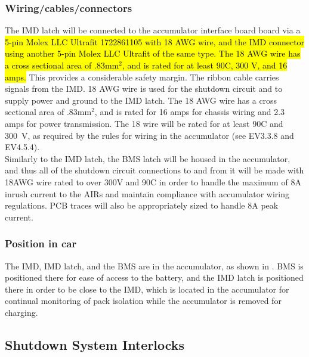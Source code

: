 \documentclass{article}
\DeclareRobustCommand{\hlr}[1]{{\sethlcolor{pink}\hl{#1}}}
\begin{document}
\subsubsection{Wiring/cables/connectors}
The IMD latch will be connected to the accumulator interface board board via a \hlr{5-pin Molex LLC Ultrafit 1722861105 with 18 AWG wire, and the IMD connector using another 5-pin Molex LLC Ultrafit of the same type. The 18 AWG wire has a cross sectional area of .83mm$^2$, and is rated for at least 90\textdegree C, 300 V, and 16 amps.} This provides a considerable safety margin. The ribbon cable carries signals from the IMD. 18 AWG wire is used for the shutdown circuit and to supply power and ground to the IMD latch. The 18 AWG wire has a cross sectional area of .83mm$^2$, and is rated for 16 amps for chassis wiring and 2.3 amps for power transmission. The 18 wire will be rated for at least 90\textdegree C and 300~V, as required by the rules for wiring in the accumulator (see EV3.3.8 and EV4.5.4).\\

Similarly to the IMD latch, the BMS latch will be housed in the accumulator, and thus all of the shutdown circuit connections to and from it will be made with 18AWG wire rated to over 300V and 90\textdegree C in order to handle the maximum of 8A inrush current to the AIRs and maintain compliance with accumulator wiring regulations. PCB traces will also be appropriately sized to handle 8A peak current. 


\subsubsection{Position in car}
The IMD, IMD latch, and the BMS are in the accumulator, as shown in . BMS is positioned there for ease of access to the battery, and the IMD latch is positioned there in order to be close to the IMD, which is located in the accumulator for continual monitoring of pack isolation while the accumulator is removed for charging. 

\subsection{Shutdown System Interlocks}\label{shutdown_system_interlocks}
\end{document}
